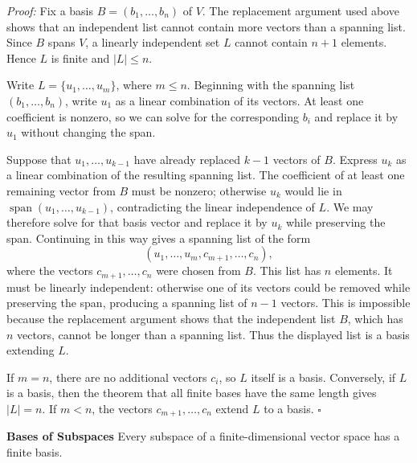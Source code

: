 \documentclass[a4paper,11pt,abstract=true]{scrartcl}
\theoremstyle{dotlessP}
\theoremstyle{dotlessS}
\theoremstyle{remark}
\theoremstyle{definition}
\begin{document}
\begin{claim_box}
\textit{Proof:} Fix a basis $B=(b_1,\ldots,b_n)$ of $V$. The replacement
argument used above shows that an independent list cannot contain more
vectors than a spanning list. Since $B$ spans $V$, a linearly independent set
$L$ cannot contain $n+1$ elements. Hence $L$ is finite and $|L|\leq n$.

Write $L=\{u_1,\ldots,u_m\}$, where $m\leq n$. Beginning with the spanning
list $(b_1,\ldots,b_n)$, write $u_1$ as a linear combination of its vectors.
At least one coefficient is nonzero, so we can solve for the corresponding
$b_i$ and replace it by $u_1$ without changing the span.

Suppose that $u_1,\ldots,u_{k-1}$ have already replaced $k-1$ vectors of
$B$. Express $u_k$ as a linear combination of the resulting spanning list.
The coefficient of at least one remaining vector from $B$ must be nonzero;
otherwise $u_k$ would lie in
$\operatorname{span}(u_1,\ldots,u_{k-1})$, contradicting the linear
independence of $L$. We may therefore solve for that basis vector and replace
it by $u_k$ while preserving the span. Continuing in this way gives a
spanning list of the form
\[
(u_1,\ldots,u_m,c_{m+1},\ldots,c_n),
\]
where the vectors $c_{m+1},\ldots,c_n$ were chosen from $B$. This list has
$n$ elements. It must be linearly independent: otherwise one of its vectors
could be removed while preserving the span, producing a spanning list of
$n-1$ vectors. This is impossible because the replacement argument shows
that the independent list $B$, which has $n$ vectors, cannot be longer than
a spanning list. Thus the displayed list is a basis extending $L$.

If $m=n$, there are no additional vectors $c_i$, so $L$ itself is a basis.
Conversely, if $L$ is a basis, then the theorem that all finite bases have the
same length gives $|L|=n$. If $m<n$, the vectors
$c_{m+1},\ldots,c_n$ extend $L$ to a basis. \hfill$\square$
\end{claim_box}

\begin{problem_box}
\textbf{Bases of Subspaces}
Every subspace of a
finite-dimensional vector space has a finite basis.
\end{problem_box}
\end{document}
